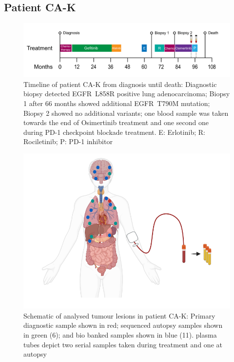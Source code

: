\cleardoublepage

\subsection{Patient CA-K}
\label{cascade-sec:CA82}

\begin{figure}[!ht]
\centering
\includegraphics[width=.99\linewidth]{Figures/CA-K_timeline}
\caption[Timeline of patient CA-K from diagnosis until death]{Timeline of patient CA-K from diagnosis until death: Diagnostic biopsy detected EGFR~L858R positive lung adenocarcinoma;  Biopsy 1 after 66 months showed additional EGFR~T790M mutation; Biopsy 2 showed no additional variants; one blood sample was taken towards the end of Osimertinib treatment and one second one during PD-1 checkpoint blockade treatment. E: Erlotinib; R: Rociletinib; P: PD-1 inhibitor} \label{fig:ca82timeline}
\end{figure}




\begin{figure}[!ht]
\centering
\includegraphics[width=.99\linewidth]{Figures/CA-K_schematic_CA82}
\caption[Schematic of analysed tumour lesions in patient CA-K]{Schematic of analysed tumour lesions in patient CA-K: Primary diagnostic sample shown in red; sequenced autopsy samples shown in green (6); and bio banked samples shown in blue (11). plasma tubes depict two serial samples taken during treatment and one at autopsy} \label{fig:cas82schematic}
\end{figure}

